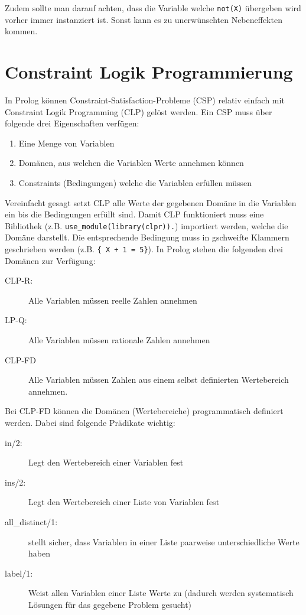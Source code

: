 Zudem sollte man darauf achten, dass die Variable welche \verb|not(X)| übergeben wird vorher immer instanziert ist. Sonst kann es zu unerwünschten Nebeneffekten kommen.

\section{Constraint Logik Programmierung}

In Prolog können Constraint-Satisfaction-Probleme (CSP) relativ einfach mit Constraint Logik Programming (CLP) gelöst werden. Ein CSP muss über folgende drei Eigenschaften verfügen:
\begin{enumerate}
	\item Eine Menge von Variablen
	\item Domänen, aus welchen die Variablen Werte annehmen können
	\item Constraints (Bedingungen) welche die Variablen erfüllen müssen
\end{enumerate}
Vereinfacht gesagt setzt CLP alle Werte der gegebenen Domäne in die Variablen ein bis die Bedingungen erfüllt sind. Damit CLP funktioniert muss eine Bibliothek (z.B. \verb|use_module(library(clpr)).|) importiert werden, welche die Domäne darstellt. Die entsprechende Bedingung muss in gschweifte Klammern geschrieben werden (z.B. \verb|{ X + 1 = 5}|). In Prolog stehen die folgenden drei Domänen zur Verfügung:
\begin{description}
	\item[CLP-R:] Alle Variablen müssen reelle Zahlen annehmen
	\item[LP-Q:] Alle Variablen müssen rationale Zahlen annehmen
	\item[CLP-FD] Alle Variablen müssen Zahlen aus einem selbst definierten Wertebereich annehmen.
\end{description}
Bei CLP-FD können die Domänen (Wertebereiche) programmatisch definiert werden. Dabei sind folgende Prädikate wichtig:
\begin{description}
	\item[in/2:] Legt den Wertebereich einer Variablen fest
	\item[ins/2:] Legt den Wertebereich einer Liste von Variablen fest
	\item[all\_distinct/1:] stellt sicher, dass Variablen in einer Liste paarweise unterschiedliche Werte haben
	\item[label/1:] Weist allen Variablen einer Liste Werte zu (dadurch werden systematisch Lösungen für das gegebene Problem gesucht)
\end{description}
